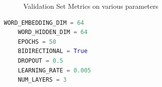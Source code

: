 \begin{figure}[h]
    \caption{Validation Set Metrics on various parameters}
\end{figure}


\begin{lstlisting}[language=Python]
	WORD_EMBEDDING_DIM = 64
	WORD_HIDDEN_DIM = 64
	EPOCHS = 50
	BIDIRECTIONAL = True
	DROPOUT = 0.5
	LEARNING_RATE = 0.005
	NUM_LAYERS = 3
\end{lstlisting}


